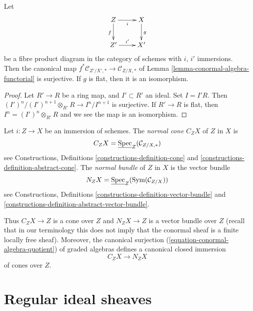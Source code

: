 \begin{lemma}
\label{lemma-conormal-algebra-functorial-flat}
Let
$$
\xymatrix{
Z \ar[r]_i \ar[d]_f & X \ar[d]^g \\
Z' \ar[r]^{i'} & X'
}
$$
be a fibre product diagram in the category of schemes with
$i$, $i'$ immersions. Then the canonical map
$f^*\mathcal{C}_{Z'/X', *} \to \mathcal{C}_{Z/X, *}$ of
Lemma \ref{lemma-conormal-algebra-functorial}
is surjective. If $g$ is flat, then it is an isomorphism.
\end{lemma}

\begin{proof}
Let $R' \to R$ be a ring map, and $I' \subset R'$ an ideal.
Set $I = I'R$. Then $(I')^n/(I')^{n + 1} \otimes_{R'} R \to I^n/I^{n + 1}$
is surjective. If $R' \to R$ is flat, then $I^n = (I')^n \otimes_{R'} R$
and we see the map is an isomorphism.
\end{proof}

\begin{definition}
\label{definition-normal-cone}
Let $i : Z \to X$ be an immersion of schemes.
The {\it normal cone $C_ZX$} of $Z$ in $X$ is
$$
C_ZX = \underline{\mathop{\mathrm{Spec}}}_Z(\mathcal{C}_{Z/X, *})
$$
see
Constructions,
Definitions \ref{constructions-definition-cone} and
\ref{constructions-definition-abstract-cone}. The {\it normal bundle}
of $Z$ in $X$ is the vector bundle
$$
N_ZX = \underline{\mathop{\mathrm{Spec}}}_Z(\text{Sym}(\mathcal{C}_{Z/X}))
$$
see
Constructions,
Definitions \ref{constructions-definition-vector-bundle} and
\ref{constructions-definition-abstract-vector-bundle}.
\end{definition}

\noindent
Thus $C_ZX \to Z$ is a cone over $Z$ and $N_ZX \to Z$ is a vector bundle
over $Z$ (recall that in our terminology this does not imply that
the conormal sheaf is a finite locally free sheaf). Moreover, the canonical
surjection (\ref{equation-conormal-algebra-quotient}) of graded algebras
defines a canonical closed immersion
\begin{equation}
\label{equation-normal-cone-in-normal-bundle}
C_ZX \longrightarrow N_ZX
\end{equation}
of cones over $Z$.





\section{Regular ideal sheaves}
\label{section-regular-ideal-sheaves}

